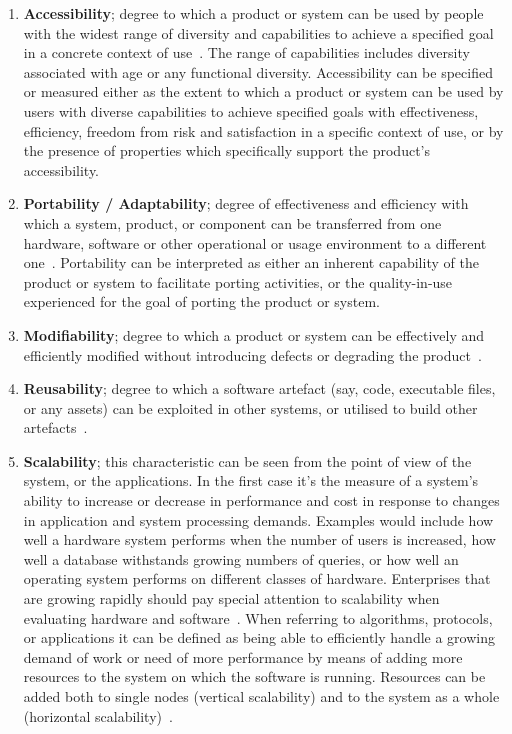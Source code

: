 \begin{enumerate}
    \item \textbf{Accessibility}; degree to which a product or system can be used by people with the widest range of diversity and capabilities to achieve a specified goal in a concrete context of use~\cite{iso_25010_2011_2017}. The range of capabilities includes diversity associated with age or any functional diversity. Accessibility can be specified or measured either as the extent to which a product or system can be used by users with diverse capabilities to achieve specified goals with effectiveness, efficiency, freedom from risk and satisfaction in a specific context of use, or by the presence of properties which specifically support the product's accessibility.
    
    \item \textbf{Portability / Adaptability}; degree of effectiveness and efficiency with which a system, product, or component can be transferred from one hardware, software or other operational or usage environment to a different one~\cite{iso_25010_2011_2017}. Portability can be interpreted as either an inherent capability of the product or system to facilitate porting activities, or the quality-in-use experienced for the goal of porting the product or system.

    \item \textbf{Modifiability}; degree to which a product or system can be effectively and efficiently modified without introducing defects or degrading the product~\cite{iso_25010_2011_2017}.

    \item \textbf{Reusability}; degree to which a software artefact (say, code, executable files, or any assets) can be exploited in other systems, or utilised to build other artefacts~\cite{iso_25010_2011_2017}.

    \item \textbf{Scalability}; this characteristic can be seen from the point of view of the system, or the applications. In the first case
    it's the measure of a system's ability to increase or decrease in performance and cost in response to changes in application and system processing demands. Examples would include how well a hardware system performs when the number of users is increased, how well a database withstands growing numbers of queries, or how well an operating system performs on different classes of hardware. Enterprises that are growing rapidly should pay special attention to scalability when evaluating hardware and software~\cite{gartner_2021}. When referring to algorithms, protocols, or applications it can be defined as being able to efficiently handle a growing demand of work or need of more performance by means of adding more resources to the system on which the software is running. Resources can be added both to single nodes (vertical scalability) and to the system as a whole (horizontal scalability)~\cite{bondi_2000}.


\end{enumerate}
